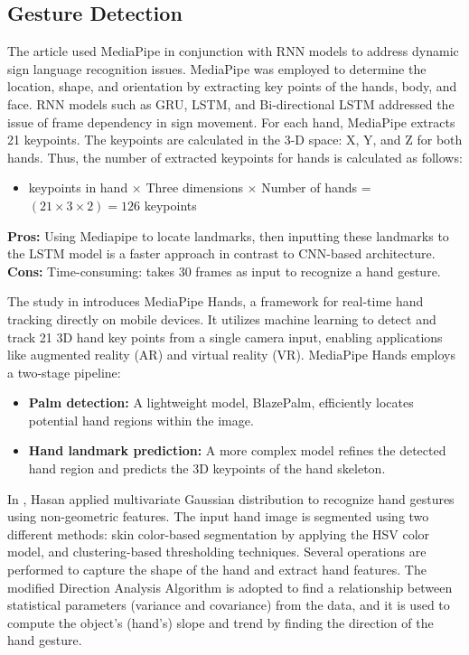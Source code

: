\subsection{Gesture Detection}
The article \cite{mediapipernn2022signlanguage} used MediaPipe in conjunction with RNN models to address dynamic sign language recognition issues. MediaPipe was employed to determine the location, shape, and orientation by extracting key points of the hands, body, and face. RNN models such as GRU, LSTM, and Bi-directional LSTM addressed the issue of frame dependency in sign movement. For each hand, MediaPipe extracts 21 keypoints. The keypoints are calculated in the 3-D space: X, Y, and Z for both hands. Thus, the number of extracted keypoints for hands is calculated as follows:
\begin{itemize}
	\item keypoints in hand $\times$ Three dimensions $\times$ Number of hands = $(21 \times 3 \times 2) = 126$ keypoints
\end{itemize}
\textbf{Pros:} Using Mediapipe to locate landmarks, then inputting these landmarks to the LSTM model is a faster approach in contrast to CNN-based architecture.\\
\textbf{Cons:} Time-consuming: takes 30 frames as input to recognize a hand gesture.

The study in \cite{mediapipe2019hands} introduces MediaPipe Hands, a framework for real-time hand tracking directly on mobile devices. It utilizes machine learning to detect and track 21 3D hand key points from a single camera input, enabling applications like augmented reality (AR) and virtual reality (VR). MediaPipe Hands employs a two-stage pipeline:
\begin{itemize}
	\item \textbf{Palm detection:} A lightweight model, BlazePalm, efficiently locates potential hand regions within the image.
	\item \textbf{Hand landmark prediction:} A more complex model refines the detected hand region and predicts the 3D keypoints of the hand skeleton.
\end{itemize}

In \cite{mokhar2021gaussian}, Hasan applied multivariate Gaussian distribution to recognize hand gestures using non-geometric features. The input hand image is segmented using two different methods: skin color-based segmentation by applying the HSV color model, and clustering-based thresholding techniques. Several operations are performed to capture the shape of the hand and extract hand features. The modified Direction Analysis Algorithm is adopted to find a relationship between statistical parameters (variance and covariance) from the data, and it is used to compute the object's (hand's) slope and trend by finding the direction of the hand gesture.


